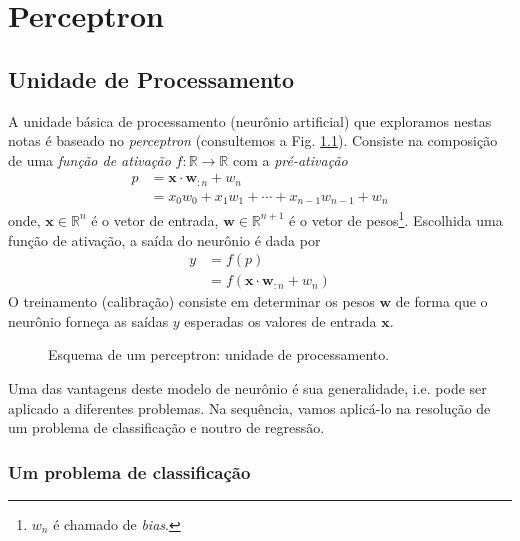 
\chapter{Perceptron}\label{cap_perceptron}
\thispagestyle{fancy}

\section{Unidade de Processamento}

A unidade básica de processamento (neurônio artificial) que exploramos nestas notas é baseado no \emph{perceptron} (consultemos a Fig. \ref{fig:perceptron}). Consiste na composição de uma \emph{função de ativação} $f:\mathbb{R}\to\mathbb{R}$ com a \emph{pré-ativação}
\begin{align}
  p &= \pmb{x}\cdot\pmb{w}_{:n} + w_{n}\\
    &= x_0w_0 + x_1w_1 + \cdots + x_{n-1}w_{n-1} + w_{n}
\end{align}
onde, $\pmb{x}\in\mathbb{R}^{n}$ é o vetor de entrada, $\pmb{w}\in\mathbb{R}^{n+1}$ é o vetor de pesos\footnote{$w_{n}$ é chamado de \emph{bias}.}. Escolhida uma função de ativação, a saída do neurônio é dada por
\begin{align}
  y &= f(p)\\
    &= f(\pmb{x}\cdot\pmb{w}_{:n} + w_n)
\end{align}
O treinamento (calibração) consiste em determinar os pesos $\pmb{w}$ de forma que o neurônio forneça as saídas $y$ esperadas os valores de entrada $\pmb{x}$.

\begin{figure}[H]
  \centering
  
  \caption{Esquema de um perceptron: unidade de processamento.}
  \label{fig:perceptron}
\end{figure}

Uma das vantagens deste modelo de neurônio é sua generalidade, i.e. pode ser aplicado a diferentes problemas. Na sequência, vamos aplicá-lo na resolução de um problema de classificação e noutro de regressão.

\subsection{Um problema de classificação}

